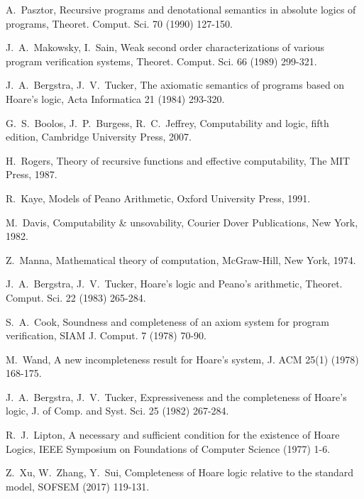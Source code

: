 \documentclass[a4paper,11pt]{article}
\begin{document}
\begin{thebibliography}{99}
A.~Pasztor,
\newblock Recursive programs and denotational semantics in absolute logics of programs,
\newblock Theoret. Comput. Sci. 70 (1990) 127-150.

J.~A.~Makowsky, I.~Sain,
\newblock Weak second order characterizations of various program verification systems,
\newblock Theoret. Comput. Sci. 66 (1989) 299-321.

J.~A.~Bergstra, J.~V.~Tucker,
\newblock The axiomatic semantics of programs based on Hoare's logic,
\newblock Acta Informatica 21 (1984) 293-320.

G.~S.~Boolos, J.~P.~Burgess, R.~C.~Jeffrey,
\newblock Computability and logic, fifth edition,
\newblock Cambridge University Press, 2007.

H.~Rogers,
\newblock Theory of recursive functions and effective computability,
\newblock The MIT Press, 1987.

R.~Kaye,
\newblock Models of Peano Arithmetic,
\newblock Oxford University Press, 1991.

M.~Davis,
\newblock Computability \& unsovability,
\newblock Courier Dover Publications, New York, 1982.

Z.~Manna,
\newblock Mathematical theory of computation,
\newblock McGraw-Hill, New York, 1974.

J.~A.~Bergstra, J.~V.~Tucker,
\newblock Hoare's logic and Peano's arithmetic,
\newblock Theoret. Comput. Sci. 22 (1983) 265-284.

S.~A.~Cook,
\newblock Soundness and completeness of an axiom system for program verification,
\newblock SIAM J. Comput. 7 (1978) 70-90.

M.~Wand,
\newblock A new incompleteness result for Hoare's system,
\newblock J. ACM 25(1) (1978) 168-175.

J.~A.~Bergstra, J.~V.~Tucker,
\newblock Expressiveness and the completeness of Hoare's logic,
\newblock J. of Comp. and Syst. Sci. 25 (1982) 267-284.

R.~J.~Lipton,
\newblock A necessary and sufficient condition for the existence of Hoare Logics,
\newblock IEEE Symposium on Foundations of Computer Science (1977) 1-6.

Z.~Xu, W.~Zhang, Y.~Sui,
\newblock Completeness of Hoare logic relative to the standard model,
\newblock SOFSEM (2017) 119-131.


\end{thebibliography}
\end{document}
